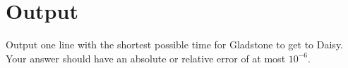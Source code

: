 \section*{Output}
Output one line with the shortest possible time for Gladstone to get to Daisy.
Your answer should have an absolute or relative error of at most $10^{-6}$.
